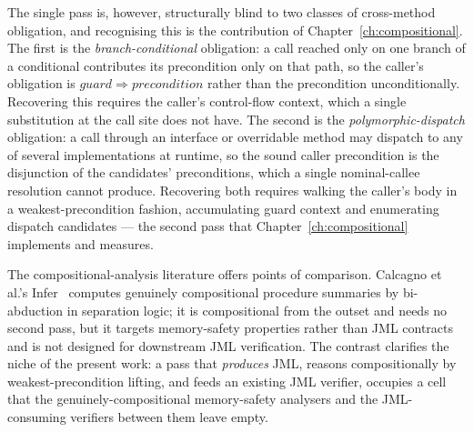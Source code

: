 The single pass is, however, structurally blind to two classes of cross-method
obligation, and recognising this is the contribution of
Chapter~\ref{ch:compositional}. The first is the \emph{branch-conditional}
obligation: a call reached only on one branch of a conditional contributes its
precondition only on that path, so the caller's obligation is
$\mathit{guard} \Rightarrow \mathit{precondition}$ rather than the precondition
unconditionally. Recovering this requires the caller's control-flow context,
which a single substitution at the call site does not have. The second is the
\emph{polymorphic-dispatch} obligation: a call through an interface or
overridable method may dispatch to any of several implementations at runtime,
so the sound caller precondition is the disjunction of the candidates'
preconditions, which a single nominal-callee resolution cannot produce.
Recovering both requires walking the caller's body in a weakest-precondition
fashion, accumulating guard context and enumerating dispatch candidates ---
the second pass that Chapter~\ref{ch:compositional} implements and measures.

The compositional-analysis literature offers points of comparison. Calcagno et
al.'s Infer~\cite{calcagno2015infer} computes genuinely compositional
procedure summaries by bi-abduction in separation logic; it is compositional
from the outset and needs no second pass, but it targets memory-safety
properties rather than JML contracts and is not designed for downstream JML
verification. The contrast clarifies the niche of the present work: a pass that
\emph{produces} JML, reasons compositionally by weakest-precondition lifting,
and feeds an existing JML verifier, occupies a cell that the
genuinely-compositional memory-safety analysers and the JML-consuming
verifiers between them leave empty.

